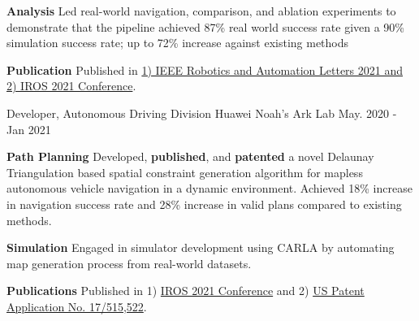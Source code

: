 \begin{cventries}
{\begin{cvitems}
{			}
			\item {
				\textbf{Analysis} Led real-world navigation, comparison, and ablation experiments to demonstrate that the pipeline achieved 87\% real world success rate given a 90\% simulation success rate; up to 72\% increase against existing methods
			}
			\item {
				\textbf{Publication} Published in \href{https://ieeexplore.ieee.org/document/9468918}{1) IEEE Robotics and Automation Letters 2021 and 2) IROS 2021 Conference}.
			}
		\end{cvitems}
	}
	\cventry
	{Developer, Autonomous Driving Division}
	{Huawei Noah’s Ark Lab}
	{May. 2020 - Jan 2021}
	{}
	{
		\begin{cvitems}
			\item {
				\textbf{Path Planning} Developed, \textbf{published}, and \textbf{patented} a novel Delaunay Triangulation based spatial constraint generation algorithm for mapless autonomous vehicle navigation in a dynamic environment. Achieved 18\% increase in navigation success rate and 28\% increase in valid plans compared to existing methods.
			}
			\item {
				\textbf{Simulation} Engaged in simulator development using CARLA by automating map generation process from real-world datasets.
			}
			\item{
				\textbf{Publications} Published in 1) \href{https://ieeexplore.ieee.org/document/9636067}{IROS 2021 Conference} and 2) \href{https://patents.google.com/patent/US20220135068A1/en}{US Patent Application No. 17/515,522}.
			}
		\end{cvitems}
	}

\end{cventries}
